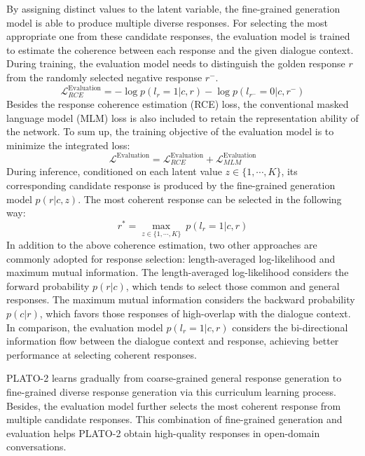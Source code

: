 \documentclass[letterpaper]{article} \usepackage{aaai21}  \usepackage{times}  \usepackage{helvet} \usepackage{courier}  \usepackage[hyphens]{url}  \usepackage{graphicx} \urlstyle{rm} \def\UrlFont{\rm}  \usepackage{natbib}  \usepackage{caption} \frenchspacing  \setlength{\pdfpagewidth}{8.5in}  \setlength{\pdfpageheight}{11in}  \usepackage{amsmath}
\begin{document}
By assigning distinct values to the latent variable, the fine-grained generation model is able to produce multiple diverse responses. For selecting the most appropriate one from these candidate responses, the evaluation model is trained to estimate the coherence between each response and the given dialogue context. During training, the evaluation model needs to distinguish the golden response $r$ from the randomly selected negative response $r^-$. 
\begin{equation}\nonumber
\mathcal{L}_{RCE}^{\text{Evaluation}}=-\log p(l_r=1|c,r)
-\log p(l_{r^-}=0|c,r^-)
\end{equation}
Besides the response coherence estimation (RCE) loss, the conventional masked language model (MLM) loss \cite{devlin2019bert} is also included to retain the representation ability of the network. To sum up, the training objective of the evaluation model is to minimize the integrated loss:
\begin{equation}
\mathcal{L}^{\text{Evaluation}}=\mathcal{L}_{RCE}^{\text{Evaluation}}+\mathcal{L}_{MLM}^{\text{Evaluation}}
\end{equation}
During inference, conditioned on each latent value $z\in \{1,\cdots,K\}$, its corresponding candidate response is produced by the fine-grained generation model $p(r|c, z)$. The most coherent response can be selected in the following way:
\begin{equation}
    r^* = \max_{z \in \{1,\cdots,K\}}~ p(l_{r}=1|c,r)
\end{equation}
In addition to the above coherence estimation, two other approaches are commonly adopted for response selection: length-averaged log-likelihood and maximum mutual information. The length-averaged log-likelihood considers the forward probability $p(r|c)$, which tends to select those common and general responses. The maximum mutual information considers the backward probability $p(c|r)$, which favors those responses of high-overlap with the dialogue context. In comparison, the evaluation model $p(l_r=1|c,r)$ considers the bi-directional information flow between the dialogue context and response, achieving better performance at selecting coherent responses.

PLATO-2 learns gradually from coarse-grained general response generation to fine-grained diverse response generation via this curriculum learning process. Besides, the evaluation model further selects the most coherent response from multiple candidate responses. This combination of fine-grained generation and evaluation helps PLATO-2 obtain high-quality responses in open-domain conversations.
\end{document}

